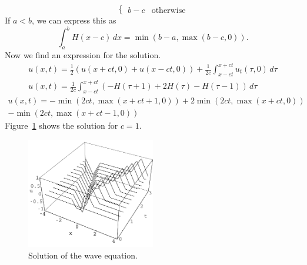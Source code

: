 {\begin{Solution}
\begin{enumerate}
\[\begin{cases}
      b-c &\mathrm{otherwise}
    \end{cases}
    \]
    If $a < b$, we can express this as
    \[
    \int_a^b H(x-c) \,d x = \min( b-a, \max( b-c, 0 ) ).
    \]
    Now we find an expression for the solution.
    \begin{gather*}
      u(x,t) = \frac{1}{2} \left( u(x+ct,0) + u(x-ct,0)\right) + 
      \frac{1}{2c} \int_{x-ct}^{x+ct} u_t(\tau,0) \,d\tau 
      \\
      u(x,t) = \frac{1}{2c} \int_{x-ct}^{x+ct} \left(
        -H(\tau+1) + 2 H(\tau) - H(\tau-1) \right) \,d\tau
    \end{gather*}
    \begin{multline*}
      u(x,t) = - \min( 2 c t, \max( x + c t + 1, 0 ) )
      + 2 \min( 2 c t, \max( x + c t, 0 ) )
      \\
      - \min( 2 c t, \max( x + c t - 1, 0 ) )
    \end{multline*}
    Figure~\ref{wave_ut_du} shows the solution for $c = 1$.
    \begin{figure}[h!]
      \begin{center}
        \includegraphics[width=0.5\textwidth]{pde/waves/wave_ut_du}
      \end{center}
      \caption{Solution of the wave equation.}
      \label{wave_ut_du}
    \end{figure}
  \end{enumerate}
\end{Solution}









}
